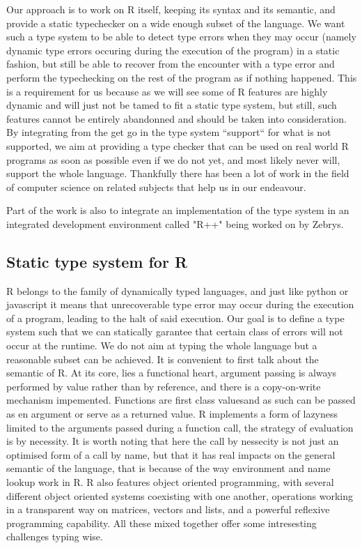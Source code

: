 Our approach is to work on R itself, keeping its syntax and its semantic, and provide a static typechecker on a wide enough subset of the language. We want such a type system to be able to detect type errors when they may occur (namely dynamic type errors occuring during the execution of the program) in a static fashion, but still be able to recover from the encounter with a type error and  perform the typechecking on the rest of the program as if nothing happened. This is a requirement for us because as we will see some of R features are highly dynamic and will just not be tamed to fit a static type system, but still, such features cannot be entirely abandonned and should be taken into consideration. By integrating from the get go in the type system ``support`` for what is not supported, we aim at providing a type checker that can be used on real world R programs as soon as possible even if we do not yet, and most likely never will, support the whole language. Thankfully there has been a lot of work in the field of computer science on related subjects that help us in our endeavour.

Part of the work is also to integrate an implementation of the type system in an integrated development environment called "R++" being worked on by Zebrys.

\subsection{Static type system for R}


R belongs to the family of dynamically typed languages, and just like python or javascript it means that unrecoverable type error may occur during the execution of a program, leading to the halt of said execution. Our goal is to define a type system such that we can statically garantee that certain class of errors will not occur at the runtime. We do not aim at typing the whole language but a reasonable subset can be achieved.
It is convenient to first talk about the semantic of R. At its core, lies a functional heart, argument passing is always performed by value rather than by reference, and there is a copy-on-write mechanism impemented. Functions are first class valuesand as such can be passed as en argument or serve as a returned value. R implements a form of lazyness limited to the arguments passed during a function call, the strategy of evaluation is by necessity. It is worth noting that here the call by nessecity is not just an optimised form of a call by name, but that it has real impacts on the general semantic of the language, that is because of the way environment and name lookup work in R. R also features object oriented programming, with several different object oriented systems coexisting with one another, operations working in a transparent way on matrices, vectors and lists, and a powerful reflexive programming capability. All these mixed together offer some intresesting challenges typing wise.



